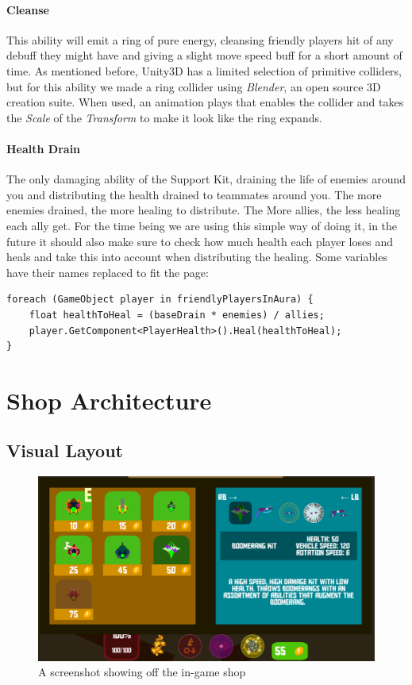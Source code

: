 \paragraph{Cleanse}
This ability will emit a ring of pure energy, cleansing friendly players hit of any debuff they might have and giving a slight move speed buff for a short amount of time. As mentioned before, Unity3D has a limited selection of primitive colliders, but for this ability we made a ring collider using \emph{Blender}, an open source 3D creation suite. When used, an animation plays that enables the collider and  takes the \emph{Scale} of the \emph{Transform} to make it look like the ring expands. 

\paragraph{Health Drain}
The only damaging ability of the Support Kit, draining the life of enemies around you and distributing the health drained to teammates around you. The more enemies drained, the more healing to distribute. The More allies, the less healing each ally get. For the time being we are using this simple way of doing it, in the future it should also make sure to check how much health each player loses and heals and take this into account when distributing the healing. Some variables have their names replaced to fit the page:

\begin{verbatim}
foreach (GameObject player in friendlyPlayersInAura) {
    float healthToHeal = (baseDrain * enemies) / allies;
    player.GetComponent<PlayerHealth>().Heal(healthToHeal);
}
\end{verbatim}

\section{Shop Architecture}
\subsection{Visual Layout}
\begin{figure}[tbph]  %
  \centering
  \includegraphics[width=.75\textwidth]{images/shopOverview}
  \caption[Screenshot showing off the in-game shop]{A screenshot showing off the in-game shop}
  \label{fig:shopOverview}
\end{figure}

